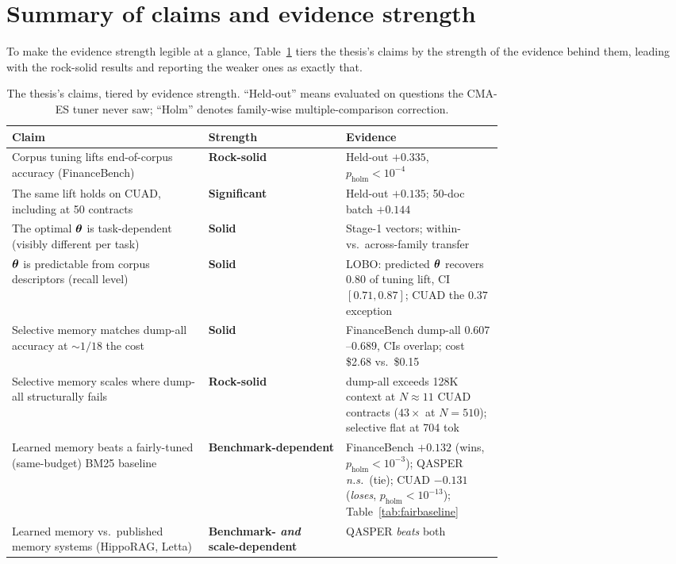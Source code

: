 \section{Summary of claims and evidence strength}
\label{sec:claims}
To make the evidence strength legible at a glance, Table~\ref{tab:claims} tiers
the thesis's claims by the strength of the evidence behind them, leading with the
rock-solid results and reporting the weaker ones as exactly that.

\begin{table}[t]
\centering
\caption{The thesis's claims, tiered by evidence strength. ``Held-out''
means evaluated on questions the CMA-ES tuner never saw; ``Holm'' denotes
family-wise multiple-comparison correction.}
\label{tab:claims}
\small
\begin{tabular}{p{0.40\linewidth} l p{0.32\linewidth}}
\toprule
Claim & Strength & Evidence \\
\midrule
Corpus tuning lifts end-of-corpus accuracy (FinanceBench) & \textbf{Rock-solid}
& Held-out $+0.335$, $p_{\mathrm{holm}}<10^{-4}$ \\
The same lift holds on CUAD, including at 50 contracts & \textbf{Significant}
& Held-out $+0.135$; 50-doc batch $+0.144$ \\
The optimal $\boldsymbol{\theta}$ is task-dependent (visibly different per task) &
\textbf{Solid} & Stage-1 vectors; within- vs.\ across-family transfer \\
$\boldsymbol{\theta}$ is predictable from corpus descriptors (recall level) &
\textbf{Solid} & LOBO: predicted $\boldsymbol{\theta}$ recovers $0.80$ of tuning lift,
CI $[0.71,0.87]$; CUAD the $0.37$ exception \\
Selective memory matches dump-all accuracy at $\sim 1/18$ the cost &
\textbf{Solid} & FinanceBench dump-all $0.607$--$0.689$, CIs overlap; cost \$2.68 vs.\ \$0.15 \\
Selective memory scales where dump-all structurally fails &
\textbf{Rock-solid} & dump-all exceeds 128K context at $N{\approx}11$ CUAD
contracts ($43\times$ at $N{=}510$); selective flat at 704 tok \\
Learned memory beats a fairly-tuned (same-budget) BM25 baseline &
\textbf{Benchmark-dependent} & FinanceBench $+0.132$ (wins,
$p_{\mathrm{holm}}{<}10^{-3}$); QASPER \emph{n.s.}\ (tie); CUAD $-0.131$
(\emph{loses}, $p_{\mathrm{holm}}{<}10^{-13}$); Table~\ref{tab:fairbaseline} \\
Learned memory vs.\ published memory systems (HippoRAG, Letta) &
\textbf{Benchmark- \emph{and} scale-dependent} & QASPER \Vt{} \emph{beats} both

\end{tabular}
\end{table}
